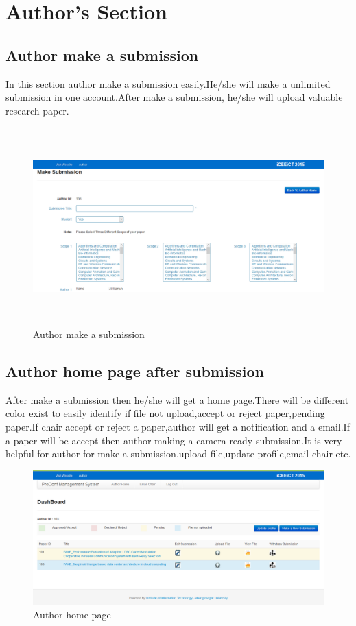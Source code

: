 \section{Author’s Section}

\subsection{Author make a submission}
In this section author make a submission easily.He/she will make a  unlimited submission in one account.After make a submission, he/she will upload valuable research paper.
\begin{figure}[h!]
\centering
  \includegraphics[width=5in,height=3in]{pic/authorm}
   \caption{Author make a submission }\label{authormake}
\end{figure}
\newpage

\subsection{Author home page after submission}
After make a submission then he/she will get a home page.There will be different color exist to easily identify if file not upload,accept or reject paper,pending paper.If chair accept or reject a paper,author will get a notification and a email.If a paper will be accept then author making a camera ready submission.It is very helpful for author for make a submission,upload file,update profile,email chair etc.

\begin{figure}[h!]
\centering
  \includegraphics[width=5in]{pic/authorhp}
   \caption{Author home page }\label{authorhome}
\end{figure}



